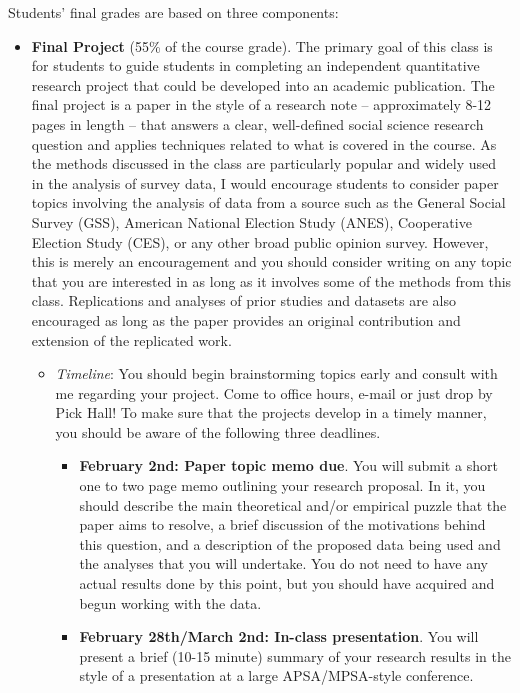 \documentclass[11pt, article, oneside]{memoir}
\theoremstyle{Assumption}
\begin{document}
Students’ final grades are based on three components:
\begin{itemize}

        
\item  \textbf{Final Project} (55\% of the course grade). The primary goal of this class is for students to guide students in completing an independent quantitative research project that could be developed into an academic publication. The final project is a paper in the style of a research note -- approximately 8-12 pages in length -- that answers a clear, well-defined social science research question and applies techniques related to what is covered in the course. As the methods discussed in the class are particularly popular and widely used in the analysis of survey data, I would encourage students to consider paper topics involving the analysis of data from a source such as the General Social Survey (GSS), American National Election Study (ANES), Cooperative Election Study (CES), or any other broad public opinion survey. However, this is merely an encouragement and you should consider writing on any topic that you are interested in as long as it involves some of the methods from this class. Replications and analyses of prior studies and datasets are also encouraged as long as the paper provides an original contribution and extension of the replicated work.
\begin{itemize}
	\item \textit{Timeline}: You should begin brainstorming topics early and consult with me regarding your project. Come to office hours, e-mail or just drop by Pick Hall! To make sure that the projects develop in a timely manner, you should be aware of the following three deadlines.
	\begin{itemize}
	\item \textbf{February 2nd: Paper topic memo due}. You will submit a short one to two page memo outlining your research proposal. In it, you should describe the main theoretical and/or empirical puzzle that the paper aims to resolve, a brief discussion of the motivations behind this question, and a description of the proposed data being used and the analyses that you will undertake. You do not need to have any actual results done by this point, but you should have acquired and begun working with the data.
	\item \textbf{February 28th/March 2nd: In-class presentation}. You will present a brief (10-15 minute) summary of your research results in the style of a presentation at a large APSA/MPSA-style conference. 

\end{itemize}
\end{itemize}
\end{itemize}
\end{document}
